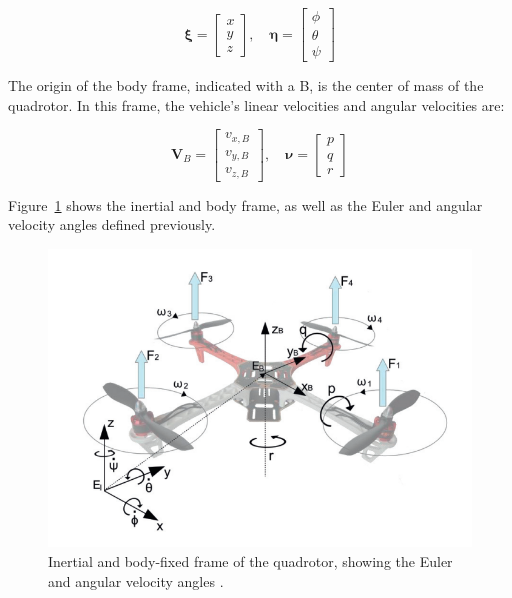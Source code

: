 \documentclass[letterpaper, 10 pt, conference]{ieeeconf}  %
\begin{document}
$$\bm{\xi}=\left[ \begin{array}{l}{x} \\ {y} \\ {z}\end{array}\right],
\quad \bm{\eta}=\left[ \begin{array}{l}{\phi} \\ {\theta} \\ {\psi}\end{array}\right]$$

The origin of the body frame, indicated with a B, is the center of mass of the quadrotor. In this frame, the vehicle's linear velocities  and angular velocities \bm{$\nu$} are:

$$\bm{V}_{B}=\left[ \begin{array}{c}{v_{x, B}} \\ {v_{y, B}} \\ {v_{z, B}}\end{array}\right], \quad \bm{\nu}=\left[ \begin{array}{l}{p} \\ {q} \\ {r}\end{array}\right]$$

Figure~\ref{fig:quad_frame} shows the inertial and body frame, as well as the Euler and angular velocity angles defined previously.

\begin{figure}[!htpb]
	\centering
	\includegraphics[width=1.0\linewidth]{Images/quad_frame.png}
	\caption{Inertial and body-fixed frame of the quadrotor, showing the Euler and angular velocity angles \cite{chovancova2014mathematical}.}
	\label{fig:quad_frame}
\end{figure}
\end{document}
